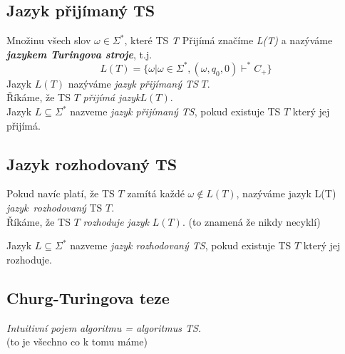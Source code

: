 \documentclass[10pt,a4paper]{article}
\theoremstyle{note}
\begin{document}
	\subsection{Jazyk přijímaný TS}

		Množinu všech slov $\omega \in \Sigma^{*}$, které TS \textit{T} Přijímá značíme \textit{L(T)} a nazýváme 					\textit{\textbf{jazykem Turingova stroje}}, t.j.
		 $$L(T) = \{ \omega | \omega \in \Sigma^{*}, (\omega, q_{0},0) \vdash^{*} C_{+}\} $$
		Jazyk $L(T)$ nazýváme \textit{jazyk přijímaný TS} $T$.\\
		Říkáme, že TS $T$ \textit{přijímá jazyk}$ L(T)$.\\

		Jazyk $L \subseteq \Sigma^{*} $ nazveme\textit{ jazyk přijímaný TS}, pokud existuje TS $T$ který jej přijímá.

	\subsection{Jazyk rozhodovaný TS}

		Pokud navíc platí, že TS $T$ zamítá každé $\omega \notin L(T)$, nazýváme jazyk L(T)
		\textit{jazyk~rozhodovaný} TS $T$.\\
		Říkáme, že TS $T$ \textit{rozhoduje jazyk} $L(T)$. (to znamená že nikdy necyklí)

		Jazyk $L \subseteq \Sigma^{*} $ nazveme\textit{ jazyk rozhodovaný TS}, pokud existuje TS $T$ který jej rozhoduje.


	\subsection{Churg-Turingova teze}

		\textit{Intuitivní pojem algoritmu = algoritmus TS.} \\(to je všechno co k tomu máme)
\end{document}
